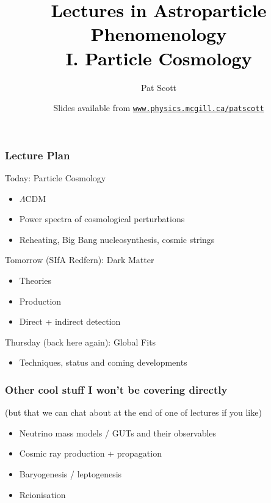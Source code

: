 \documentclass[xcolor=dvipsnames]{beamer}
\title[{\color[rgb]{0, 0, 0}Astroparticle Phenomenology I: Cosmology}]{\textcolor{black}{Lectures in Astroparticle Phenomenology\\ I. Particle Cosmology}}
\author[Pat Scott -- Feb 25 -- University of Sydney]{Pat Scott}
\institute{\small{McGill University / Imperial College London}}
\date[Feb 25, 2014]{Slides available from \color[rgb]{0.1, 0.0, 0.6} \href{http://www.physics.mcgill.ca/~patscott}{\tt www.physics.mcgill.ca/{\urltilda}patscott}}
\newcommand{\cblue}[1]{{\color[rgb]{0.1, 0.0, 0.6} #1}}
\begin{document}
\maketitle


\begin{frame}
  \frametitle{Lecture Plan}

  \cblue{Today}: Particle Cosmology
  \begin{itemize}
    \item $\Lambda$CDM
    \item Power spectra of cosmological perturbations
    \item Reheating, Big Bang nucleosynthesis, cosmic strings
  \end{itemize}
  \vspace{3mm}

  \cblue{Tomorrow} (SIfA Redfern):  Dark Matter
  \begin{itemize}
    \item Theories
    \item Production
    \item Direct + indirect detection
  \end{itemize}
  \vspace{3mm}

  \cblue{Thursday} (back here again):  Global Fits
  \begin{itemize}
    \item Techniques, status and coming developments
  \end{itemize}
    
\end{frame}


\begin{frame}
  \frametitle{Other cool stuff I won't be covering directly}
    (but that we can chat about at the end of one of lectures if you like)\vspace{1cm}

  \begin{itemize}
    \item Neutrino mass models / GUTs and their observables 
    \item Cosmic ray production + propagation
    \item Baryogenesis / leptogenesis
    \item Reionisation
  \end{itemize}\vspace{3cm}

\end{frame}
\end{document}
